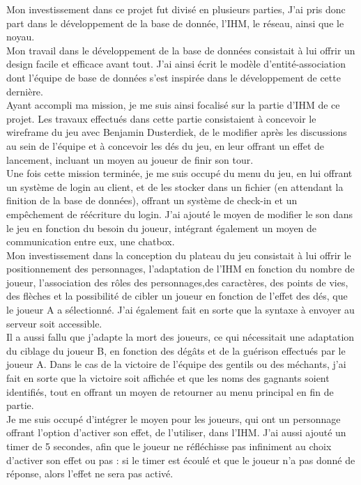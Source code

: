 \documentclass[a4paper,11pt]{article}
\begin{document}
Mon investissement dans ce projet fut divisé en plusieurs parties, J'ai pris donc part dans le développement de la base de donnée, l'IHM, le réseau, ainsi que le noyau. \\

Mon travail dans le développement de la base de données consistait à lui offrir un design facile et efficace avant tout. J'ai ainsi écrit le modèle d'entité-association dont l'équipe de base de données s'est inspirée dans le développement de cette dernière. \\

Ayant accompli ma mission, je me suis ainsi focalisé sur la partie d'IHM de ce projet. Les travaux effectués dans cette partie consistaient à concevoir le wireframe du jeu avec Benjamin Dusterdiek, de le modifier après les discussions au sein de l'équipe et à concevoir les dés du jeu, en leur offrant un effet de lancement, incluant un moyen au joueur de finir son tour. \\

Une fois cette mission terminée, je me suis occupé du menu du jeu, en lui offrant un système de login au client, et de les stocker dans un fichier (en attendant la finition de la base de données), offrant un système de check-in et un empêchement de réécriture du login.
J'ai ajouté le moyen de modifier le son dans le jeu en fonction du besoin du joueur, intégrant également un moyen de communication entre eux, une chatbox. \\

Mon investissement dans la conception du plateau du jeu consistait à lui offrir le positionnement des personnages, l'adaptation de l'IHM en fonction du nombre de joueur, l’association des rôles des personnages,des caractères, des points de vies, des flèches et la possibilité de cibler un joueur en fonction de l'effet des dés, que le joueur A a sélectionné. J’ai également fait en sorte que la syntaxe à envoyer au serveur soit accessible. \\

	Il a aussi fallu que j'adapte la mort des joueurs, ce qui nécessitait une adaptation du ciblage du joueur B, en fonction des dégâts et de la guérison effectués par le joueur A.
	Dans le cas de la victoire de l'équipe des gentils ou des méchants, j’ai fait en sorte que la victoire soit affichée et que les noms des gagnants soient identifiés, tout en offrant un moyen de retourner au menu principal en fin de partie. \\
	
Je me suis occupé d'intégrer le moyen pour les joueurs, qui ont un personnage offrant l'option d’activer son effet, de l’utiliser, dans l’IHM. J’ai aussi ajouté un timer de 5 secondes, afin que le joueur ne réfléchisse pas infiniment au choix d’activer son effet ou pas : si le timer est écoulé et que le joueur n’a pas donné de réponse, alors l’effet ne sera pas activé. \\
\end{document}
